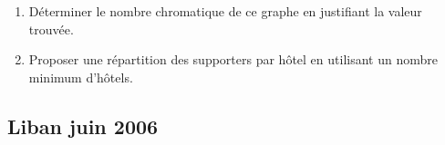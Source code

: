 \begin{enumerate}
\bigskip
\begin{center}
\end{center}

\bigskip
\begin{enumerate}
\item  Déterminer le nombre chromatique de ce graphe en justifiant la valeur trouvée. 
\item  Proposer une répartition des supporters par hôtel en utilisant un nombre minimum d'hôtels.
\end{enumerate}
\end{enumerate}
\vfill\newpage\null 
\subsection{Liban juin 2006 }\label{lib06} 

